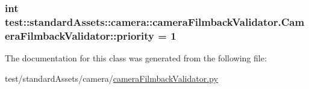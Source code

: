 \hypertarget{classtest_1_1standardAssets_1_1camera_1_1cameraFilmbackValidator_1_1CameraFilmbackValidator_aa6b13b798257a225212122c07d14dfcf}{
\subsubsection[{priority}]{\setlength{\rightskip}{0pt plus 5cm}int {\bf test\-::standard\-Assets\-::camera\-::camera\-Filmback\-Validator.\-Camera\-Filmback\-Validator\-::priority} = 1}}\label{d6/dc3/classtest_1_1standardAssets_1_1camera_1_1cameraFilmbackValidator_1_1CameraFilmbackValidator_aa6b13b798257a225212122c07d14dfcf}


\-The documentation for this class was generated from the following file\-:\begin{DoxyCompactItemize}
\item 
test/standard\-Assets/camera/\hyperlink{standardAssets_2camera_2cameraFilmbackValidator_8py}{camera\-Filmback\-Validator.\-py}\end{DoxyCompactItemize}

